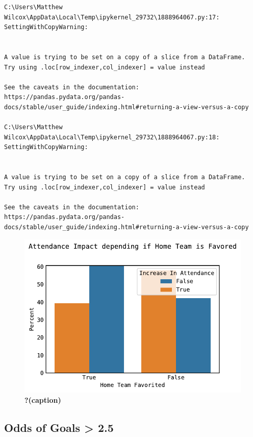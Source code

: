 \documentclass[
  letterpaper,
  DIV=11,
  numbers=noendperiod]{scrartcl}
\begin{document}
\begin{verbatim}
C:\Users\Matthew Wilcox\AppData\Local\Temp\ipykernel_29732\1888964067.py:17: SettingWithCopyWarning:


A value is trying to be set on a copy of a slice from a DataFrame.
Try using .loc[row_indexer,col_indexer] = value instead

See the caveats in the documentation: https://pandas.pydata.org/pandas-docs/stable/user_guide/indexing.html#returning-a-view-versus-a-copy

C:\Users\Matthew Wilcox\AppData\Local\Temp\ipykernel_29732\1888964067.py:18: SettingWithCopyWarning:


A value is trying to be set on a copy of a slice from a DataFrame.
Try using .loc[row_indexer,col_indexer] = value instead

See the caveats in the documentation: https://pandas.pydata.org/pandas-docs/stable/user_guide/indexing.html#returning-a-view-versus-a-copy
\end{verbatim}

\begin{figure}[H]

{\centering \includegraphics{Blog_post_files/figure-pdf/fig-home_fav-output-2.pdf}

}

\caption{\label{fig-home_fav}\textbf{?(caption)}}

\end{figure}

\hypertarget{odds-of-goals-2.5}{%
\subsection{Odds of Goals \textgreater{} 2.5}\label{odds-of-goals-2.5}}
\end{document}
